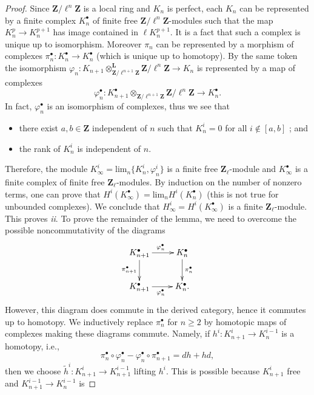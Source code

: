 \begin{proof}
Since $\mathbf{Z}/\ell^n\mathbf{Z}$ is a local ring and $K_n$ is perfect, each
$K_n$ can be represented by a finite complex $K_n^\bullet$ of finite free
$\mathbf{Z}/\ell^n \mathbf{Z}$-modules such that the map $K_n^p \to K_n^{p+1}$
has image contained in $\ell K_n^{p+1}$. It is a fact that such a complex is
unique up to isomorphism. Moreover $\pi_n$ can be represented by a morphism of
complexes $\pi_n^\bullet: K_n^\bullet\to K_n^\bullet$ (which is unique up to
homotopy). By the same token the isomorphism
$\varphi_n:K_{n+1}\otimes_{\mathbf{Z}/\ell^{n+1}\mathbf{Z}}^{\mathbf{L}}
\mathbf{Z}/\ell^n\mathbf{Z}\to K_n$ is represented by a map of complexes
$$
\varphi_n^\bullet:
K_{n+1}^\bullet\otimes_{\mathbf{Z}/\ell^{n+1}\mathbf{Z}}\mathbf{Z}/\ell^n\mathbf
{Z}\to K_n^\bullet.
$$
In fact, $\varphi_n^\bullet$ is an isomorphism of complexes, thus we see that
\begin{itemize}
\item
there exist $a, b\in \mathbf{Z}$ independent of $n$ such that $K_n^i = 0$ for
all $i\notin[a, b]$ ; and
\item
the rank of $K_n^i$ is independent of $n$.
\end{itemize}	
Therefore, the module $K_\infty^i = \text{lim}_n \{K_n^i, \varphi_n^i\}$ is a
finite free $\mathbf{Z}_\ell$-module and $K_\infty^\bullet$ is a finite complex
of finite free $\mathbf{Z}_\ell$-modules. By induction on the number of nonzero
terms, one can prove that $H^i\left(K_\infty^\bullet\right) = \text{lim}_n
H^i\left(K_n^\bullet\right)$ (this is not true for unbounded complexes). We
conclude that $H_\infty^i = H^i\left(K_\infty^\bullet\right)$ is a finite
$\mathbf{Z}_\ell$-module. This proves {\it ii}. To prove the remainder of the
lemma, we need to overcome the possible noncommutativity of the diagrams
$$
\xymatrix{
{K_{n+1}^\bullet} \ar_{\pi_{n+1}^\bullet}[d] \ar^{\varphi_n^\bullet}[r] &
{K_n^\bullet} \ar^{\pi_n^\bullet}[d] \\
{K_{n+1}^\bullet} \ar_{\varphi_n^\bullet}[r] & {K_n^\bullet.}
}
$$
However, this diagram does commute in the derived category, hence it commutes
up to homotopy. We inductively replace $\pi_n^\bullet$ for $n\geq 2$ by
homotopic maps of complexes making these diagrams commute. Namely, if $h^i:
K_{n+1}^i \to K_n^{i-1}$ is a homotopy, i.e.,
$$
\pi_n^\bullet\circ\varphi_n^\bullet-\varphi_n^\bullet\circ\pi_{n+1}^\bullet =
dh+hd,
$$
then we choose $\tilde h^i: K_{n+1}^i\to K_{n+1}^{i-1}$ lifting $h^i$. This is
possible because $K_{n+1}^i$ free and $K_{n+1}^{i-1}\to K_n^{i-1}$ is

\end{proof}
